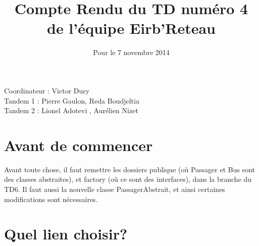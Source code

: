 \documentclass[a4paper,11pt]{article}
\begin{document}
\title{Compte Rendu du TD numéro 4 de l'équipe Eirb'Reteau}
\date{Pour le 7 novembre 2014}
\maketitle

\begin{center}
  Coordinateur : Victor Dury \\
  Tandem 1 : Pierre Gaulon, Reda Boudjeltia \\
  Tandem 2 :  Lionel Adotevi ,  Aurélien Nizet \\
\end{center}
\maketitle
\section{Avant de commencer}
Avant toute chose, il faut remettre les dossiers publique (où Passager et Bus sont des classes abstraites), et factory (où ce sont des interfaces), dans la branche du TD6. Il faut aussi la nouvelle classe PassagerAbstrait, et ainsi certaines modifications sont nécessaires.

\section{Quel lien choisir?}
\end{document}
